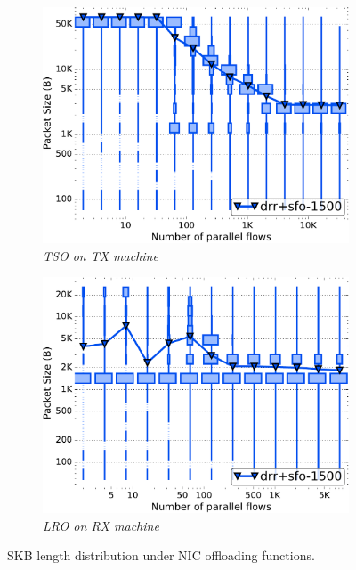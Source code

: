 \begin{figure}[t]
    \centering
    \begin{subfigure}[t]{.40\linewidth}
        \centering
        \includegraphics[width=1\linewidth]{figs/paral_cn_1t16x1024_gso_pkthist_fq_drr_1500.pdf}
        \vspace{-2mm}
        \caption{\small{\textit{TSO on TX machine}}}
	\label{fig:packets-edge}
    \end{subfigure}
    \begin{subfigure}[t]{.40\linewidth}
      \centering
      \includegraphics[width=1\linewidth]{figs/paral_cn_1t4x1024_gro_pkthist_fq_drr_1500.pdf}
      \vspace{-2mm}
      \caption{\small{\textit{LRO on RX machine}}}
      \label{fig:packets-core}
    \end{subfigure}
    \vspace{-1mm}
    \caption{\small{
        SKB length distribution under NIC offloading functions. 
    }}
    \label{fig:packets}
    \vspace{-2mm}
\end{figure}

